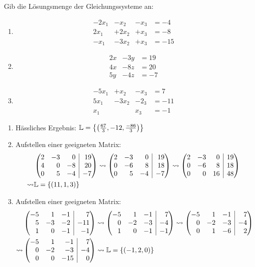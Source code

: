 Gib die Lösungsmenge der Gleichungssysteme an:
\begin{multicols}{3}
	\begin{enumerate}
		\item\begin{alignat*}{4}%
			-2x_1& -x_2& - x_3& = -4\\
			2x_1& +2x_2 & + x_3& = -8\\
			-x_1& -3x_2 & + x_3& =-15
		\end{alignat*}
		\item\begin{alignat*}{4}%
			2x&-3y&=19\\
			4x&-8z&=20\\
			5y&-4z&=-7
		\end{alignat*}
		\item\begin{alignat*}{4}
			-5x_1& +x_2& -x_3& = 7\\
			5x_1&  -3x_2& -2_3& = -11\\
			x_1& & x_3& =-1
		\end{alignat*}
	\end{enumerate}
\end{multicols}
\begin{lsg}{}
\begin{enumerate}
	\item Hässliches Ergebnis: $\mathbb{L}=\left\{ \left(\frac{67}{3},-12,\frac{-86}3\right) \right\}$
	\item Aufstellen einer geeigneten Matrix:
	\begin{align*}
		&\ematrix{rrr|r}{2&-3&0&19\\4&0&-8&20\\0&5&-4&-7}
		\rightsquigarrow\ematrix{rrr|r}{2&-3&0&19\\0&-6&8&18\\0&5&-4&-7}\rightsquigarrow\ematrix{rrr|r}{2&-3&0&19\\0&-6&8&18\\0&0&16&48}\\
		\rightsquigarrow&\mathbb{L}=\simpleset{(11,1,3)}
	\end{align*}

	\item Aufstellen einer geeigneten Matrix:
	\begin{align*}
		&\ematrix{rrr|r}{-5&1&-1&7\\5&-3&-2&-11\\1&0&-1&-1}
		\rightsquigarrow\ematrix{rrr|r}{-5&1&-1&7\\0&-2&-3&-4\\1&0&-1&-1}
		\rightsquigarrow\ematrix{rrr|r}{-5&1&-1&7\\0&-2&-3&-4\\0&1&-6&2}\\
		\rightsquigarrow&\ematrix{rrr|r}{-5&1&-1&7\\0&-2&-3&-4\\0&0&-15&0}
		\rightsquigarrow\mathbb{L}=\simpleset{(-1,2,0)}
	\end{align*}
\end{enumerate}
\end{lsg}






